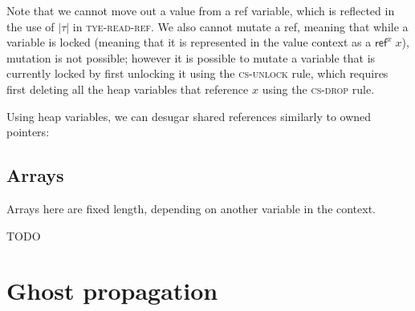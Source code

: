 \documentclass[acmsmall,nonacm]{acmart}
\DeclareMathOperator*{\Sep}{\scalerel*{\ast}{\sum}}
\newcommand*{\N}{\mathbb{N}}
\newcommand{\core}[1]{\left| #1 \right|}
\newcommand{\proves}{\vdash}
\begin{document}
Note that we cannot move out a value from a ref variable, which is reflected in the use of $\core\tau$ in \textsc{tye-read-ref}. We also cannot mutate a ref, meaning that while a variable is locked (meaning that it is represented in the value context as a $\mathsf{ref}^x\;x$), mutation is not possible; however it is possible to mutate a variable that is currently locked by first unlocking it using the \textsc{cs-unlock} rule, which requires first deleting all the heap variables that reference $x$ using the \textsc{cs-drop} rule.

Using heap variables, we can desugar shared references similarly to owned pointers:


\subsection{Arrays}\label{sec:arrays}

Arrays here are fixed length, depending on another variable in the context.


TODO

\section{Ghost propagation}
\end{document}
